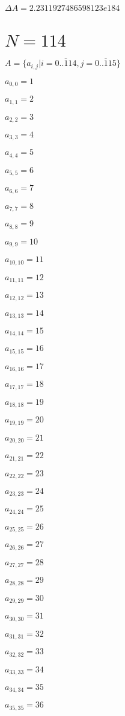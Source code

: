 \documentclass[a4paper,12pt]{article}
\begin{document}
$\Delta A = 2.2311927486598123e184$



\section{ $N = 114$ }
$A = \{ a _{ i, j } | i = \overline { 0..114 }, j = \overline { 0..115 } \}$

$a _{ 0, 0 } = 1$

$a _{ 1, 1 } = 2$

$a _{ 2, 2 } = 3$

$a _{ 3, 3 } = 4$

$a _{ 4, 4 } = 5$

$a _{ 5, 5 } = 6$

$a _{ 6, 6 } = 7$

$a _{ 7, 7 } = 8$

$a _{ 8, 8 } = 9$

$a _{ 9, 9 } = 10$

$a _{ 10, 10 } = 11$

$a _{ 11, 11 } = 12$

$a _{ 12, 12 } = 13$

$a _{ 13, 13 } = 14$

$a _{ 14, 14 } = 15$

$a _{ 15, 15 } = 16$

$a _{ 16, 16 } = 17$

$a _{ 17, 17 } = 18$

$a _{ 18, 18 } = 19$

$a _{ 19, 19 } = 20$

$a _{ 20, 20 } = 21$

$a _{ 21, 21 } = 22$

$a _{ 22, 22 } = 23$

$a _{ 23, 23 } = 24$

$a _{ 24, 24 } = 25$

$a _{ 25, 25 } = 26$

$a _{ 26, 26 } = 27$

$a _{ 27, 27 } = 28$

$a _{ 28, 28 } = 29$

$a _{ 29, 29 } = 30$

$a _{ 30, 30 } = 31$

$a _{ 31, 31 } = 32$

$a _{ 32, 32 } = 33$

$a _{ 33, 33 } = 34$

$a _{ 34, 34 } = 35$

$a _{ 35, 35 } = 36$
\end{document}
